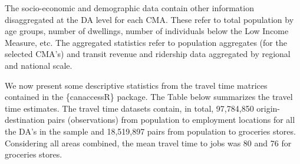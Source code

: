 \documentclass[Royal,times,sageh]{sagej}
\begin{document}
The socio-economic and demographic data contain other information
disaggregated at the DA level for each CMA. These refer to total
population by age groups, number of dwellings, number of individuals
below the Low Income Measure, etc. The aggregated statistics refer to
population aggregates (for the selected CMA's) and transit revenue and
ridership data aggregated by regional and national scale.

We now present some descriptive statistics from the travel time matrices
contained in the \{canaccessR\} package. The Table \citet{tbl-table_1}
below summarizes the travel time estimates. The travel time datasets
contain, in total, 97,784,850 origin-destination pairs (observations)
from population to employment locations for all the DA's in the sample
and 18,519,897 pairs from population to groceries stores. Considering
all areas combined, the mean travel time to jobs was 80 and 76 for
groceries stores.
\end{document}
